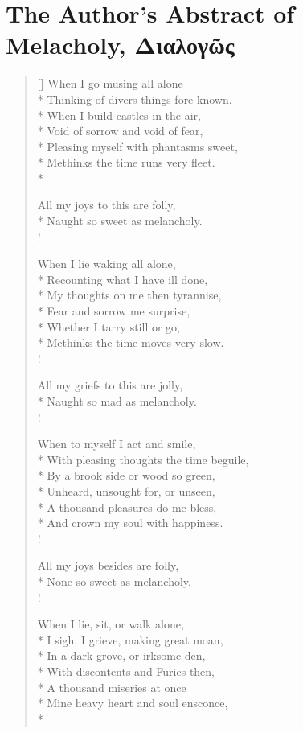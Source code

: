\chapter{The Author's Abstract of Melacholy, \textgreek{Διαλογῶς}}
\settowidth{\versewidth}{Here now, then there; the world is mine,}
\begin{verse}[\versewidth]
When I go musing all alone\\*
Thinking of divers things fore-known.\\*
When I build castles in the air,\\*
Void of sorrow and void of fear,\\*
Pleasing myself with phantasms sweet,\\*
Methinks the time runs very fleet.\\*

All my joys to this are folly,\\*
Naught so sweet as melancholy.\\!

When I lie waking all alone,\\*
Recounting what I have ill done,\\*
My thoughts on me then tyrannise,\\*
Fear and sorrow me surprise,\\*
Whether I tarry still or go,\\*
Methinks the time moves very slow.\\!

All my griefs to this are jolly,\\*
Naught so mad as melancholy.\\!

When to myself I act and smile,\\*
With pleasing thoughts the time beguile,\\*
By a brook side or wood so green,\\*
Unheard, unsought for, or unseen,\\*
A thousand pleasures do me bless,\\*
And crown my soul with happiness.\\!

All my joys besides are folly,\\*
None so sweet as melancholy.\\!

When I lie, sit, or walk alone,\\*
I sigh, I grieve, making great moan,\\*
In a dark grove, or irksome den,\\*
With discontents and Furies then,\\*
A thousand miseries at once\\*
Mine heavy heart and soul ensconce,\\*


\end{verse}
